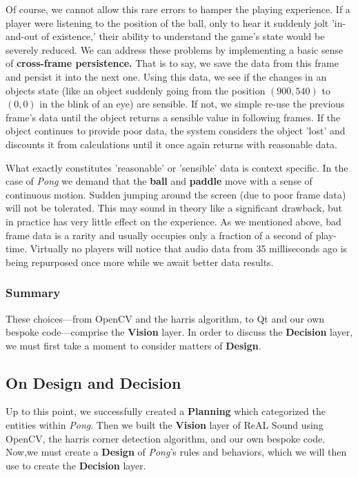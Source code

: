 \documentclass{report}
\newcommand{\rs}{ReAL Sound\xspace}
\newcommand{\plan}{\textbf{Planning}\xspace}
\newcommand{\design}{\textbf{Design}\xspace}
\newcommand{\vision}{\textbf{Vision}\xspace}
\newcommand{\decision}{\textbf{Decision}\xspace}
\newcommand{\pad}{\textbf{paddle}\xspace}
\newcommand{\ball}{\textbf{ball}\xspace}
\newcommand{\tech}[1]{\textbf{#1}}
\begin{document}
Of course, we cannot allow this rare errors to hamper the playing experience. If a player were listening to the position of the ball, only to hear it suddenly jolt 'in-and-out of existence,' their ability to understand the game's state would be severely reduced. We can address these problems by implementing a basic sense of \tech{cross-frame persistence.} That is to say, we save the data from this frame and persist it into the next one. Using this data, we see if the changes in an objects state (like an object suddenly going from the position $(900, 540)$ to $(0, 0)$ in the blink of an eye) are sensible. If not, we simple re-use the previous frame's data until the object returns a sensible value in following frames. If the object continues to provide poor data, the system considers the object 'lost' and discounts it from calculations until it once again returns with reasonable data. 

What exactly constitutes 'reasonable' or 'sensible' data is context specific. In the case of \emph{Pong} we demand that the \ball and \pad move with a sense of continuous motion. Sudden jumping around the screen (due to poor frame data) will not be tolerated. This may sound in theory like a significant drawback, but in practice has very little effect on the experience. As we mentioned above, bad frame data is a rarity and usually occupies only a fraction of a second of play-time. Virtually no players will notice that audio data from 35 milliseconds ago is being repurposed once more while we await better data results. 

\subsubsection{Summary}
These choices---from OpenCV and the harris algorithm, to Qt and our own bespoke code---comprise the \vision layer. In order to discuss the \decision layer, we must first take a moment to consider matters of \design.

\subsection{On Design and Decision}
Up to this point, we successfully created a \plan which categorized the entities within \emph{Pong}. Then we built the \vision layer of \rs using OpenCV, the harris corner detection algorithm, and our own bespoke code. Now,we must create a \design of \emph{Pong}'s rules and behaviors, which we will then use to create the \decision layer. 
\end{document}
